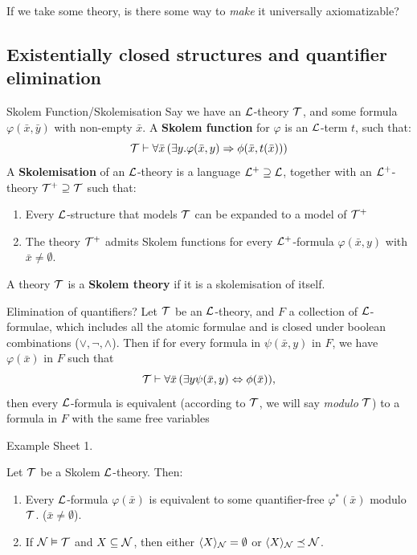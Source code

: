 \documentclass{article}
\numberwithin{thm}{subsection}
\begin{document}
\newlec 
If we take some theory, is there some way to \textit{make} it universally axiomatizable?
\subsection{Existentially closed structures and quantifier elimination}
\begin{fancydefine}{Skolem Function/Skolemisation}
     Say we have an $\mathcal{L}$-theory $\mathcal{T}$, and some formula $\varphi(\bar x, \bar y)$ with non-empty $\bar x$. A \textbf{Skolem function} for $\varphi$ is an $\mathcal{L}$-term $t$, such that: \[ \mathcal{T} \vdash \forall \bar x \, (\exists y. \varphi(\bar x, y) \Rightarrow \phi(\bar x, t(\bar x)))\]
A \textbf{Skolemisation} of an $\mathcal{L}$-theory is a language $\mathcal{L}^{+} \supseteq \mathcal{L}$, together with an $\mathcal{L}^{+}$-theory $\mathcal{T}^{+} \supseteq \mathcal{T}$ such that:
\begin{enumerate}
    \item Every $\mathcal{L}$-structure that models $\mathcal{T}$ can be expanded to a model of $\mathcal{T}^{+}$
    \item The theory $\mathcal{T}^{+}$ admits Skolem functions for every $\mathcal{L}^{+}$-formula $\varphi(\bar x, y )$ with $\bar x \neq \emptyset$.
\end{enumerate}
A theory $\mathcal{T}$ is a \textbf{Skolem theory} if it is a skolemisation of itself.
\end{fancydefine}
\begin{fancyprop}{Elimination of quantifiers?}
    Let $\mathcal{T}$ be an $\mathcal{L}$-theory, and $F$ a collection of $\mathcal{L}$-formulae, which includes all the atomic formulae and is closed under boolean combinations ($\vee, \neg, \wedge$). \gap Then if for every formula in $\psi(\bar x,y)$ in $F$, we have $\varphi( \bar x)$ in $F$ such that \[ \mathcal{T} \vdash \forall \bar x \, (\exists y \psi(\bar x, y) \Leftrightarrow \phi(\bar x)),\] then every $\mathcal{L}$-formula is equivalent (according to $\mathcal{T}$, we will say \textit{modulo} $\mathcal{T}$) to a formula in $F$ with the same free variables 
\end{fancyprop}
\proof Example Sheet 1.
\begin{fancyprop}{}
    Let $\mathcal{T}$ be a Skolem $\mathcal{L}$-theory. Then:
    \begin{enumerate}
        \item Every $\mathcal{L}$-formula $\varphi( \bar x)$ is equivalent to some quantifier-free $\varphi^{*}(\bar x)$ modulo $\mathcal{T}$. ($\bar x \neq \emptyset$).
        \item If $\mathcal{N} \vDash \mathcal{T}$ and $X \subseteq \mathcal{N}$, then either $\langle X \rangle_{\mathcal{N}} = \emptyset$ or $\langle X \rangle_{\mathcal{N}} \preceq \mathcal{N}$.
    \end{enumerate}
\end{fancyprop}
\end{document}
